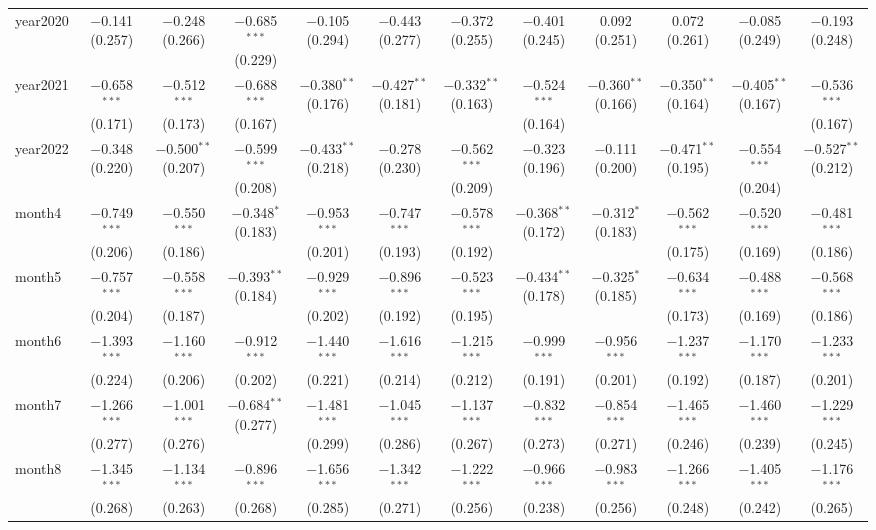\begin{table}[!htbp]
\begin{tabular}{@{\extracolsep{1pt}}lccccccccccc}
  year2020 & $-$0.141 (0.257) & $-$0.248 (0.266) & $-$0.685$^{***}$ (0.229) & $-$0.105 (0.294) & $-$0.443 (0.277) & $-$0.372 (0.255) & $-$0.401 (0.245) & 0.092 (0.251) & 0.072 (0.261) & $-$0.085 (0.249) & $-$0.193 (0.248) \\ 
  year2021 & $-$0.658$^{***}$ (0.171) & $-$0.512$^{***}$ (0.173) & $-$0.688$^{***}$ (0.167) & $-$0.380$^{**}$ (0.176) & $-$0.427$^{**}$ (0.181) & $-$0.332$^{**}$ (0.163) & $-$0.524$^{***}$ (0.164) & $-$0.360$^{**}$ (0.166) & $-$0.350$^{**}$ (0.164) & $-$0.405$^{**}$ (0.167) & $-$0.536$^{***}$ (0.167) \\ 
  year2022 & $-$0.348 (0.220) & $-$0.500$^{**}$ (0.207) & $-$0.599$^{***}$ (0.208) & $-$0.433$^{**}$ (0.218) & $-$0.278 (0.230) & $-$0.562$^{***}$ (0.209) & $-$0.323 (0.196) & $-$0.111 (0.200) & $-$0.471$^{**}$ (0.195) & $-$0.554$^{***}$ (0.204) & $-$0.527$^{**}$ (0.212) \\ 
  month4 & $-$0.749$^{***}$ (0.206) & $-$0.550$^{***}$ (0.186) & $-$0.348$^{*}$ (0.183) & $-$0.953$^{***}$ (0.201) & $-$0.747$^{***}$ (0.193) & $-$0.578$^{***}$ (0.192) & $-$0.368$^{**}$ (0.172) & $-$0.312$^{*}$ (0.183) & $-$0.562$^{***}$ (0.175) & $-$0.520$^{***}$ (0.169) & $-$0.481$^{***}$ (0.186) \\ 
  month5 & $-$0.757$^{***}$ (0.204) & $-$0.558$^{***}$ (0.187) & $-$0.393$^{**}$ (0.184) & $-$0.929$^{***}$ (0.202) & $-$0.896$^{***}$ (0.192) & $-$0.523$^{***}$ (0.195) & $-$0.434$^{**}$ (0.178) & $-$0.325$^{*}$ (0.185) & $-$0.634$^{***}$ (0.173) & $-$0.488$^{***}$ (0.169) & $-$0.568$^{***}$ (0.186) \\ 
  month6 & $-$1.393$^{***}$ (0.224) & $-$1.160$^{***}$ (0.206) & $-$0.912$^{***}$ (0.202) & $-$1.440$^{***}$ (0.221) & $-$1.616$^{***}$ (0.214) & $-$1.215$^{***}$ (0.212) & $-$0.999$^{***}$ (0.191) & $-$0.956$^{***}$ (0.201) & $-$1.237$^{***}$ (0.192) & $-$1.170$^{***}$ (0.187) & $-$1.233$^{***}$ (0.201) \\ 
  month7 & $-$1.266$^{***}$ (0.277) & $-$1.001$^{***}$ (0.276) & $-$0.684$^{**}$ (0.277) & $-$1.481$^{***}$ (0.299) & $-$1.045$^{***}$ (0.286) & $-$1.137$^{***}$ (0.267) & $-$0.832$^{***}$ (0.273) & $-$0.854$^{***}$ (0.271) & $-$1.465$^{***}$ (0.246) & $-$1.460$^{***}$ (0.239) & $-$1.229$^{***}$ (0.245) \\ 
  month8 & $-$1.345$^{***}$ (0.268) & $-$1.134$^{***}$ (0.263) & $-$0.896$^{***}$ (0.268) & $-$1.656$^{***}$ (0.285) & $-$1.342$^{***}$ (0.271) & $-$1.222$^{***}$ (0.256) & $-$0.966$^{***}$ (0.238) & $-$0.983$^{***}$ (0.256) & $-$1.266$^{***}$ (0.248) & $-$1.405$^{***}$ (0.242) & $-$1.176$^{***}$ (0.265) \\ 

\end{tabular}
\end{table}
